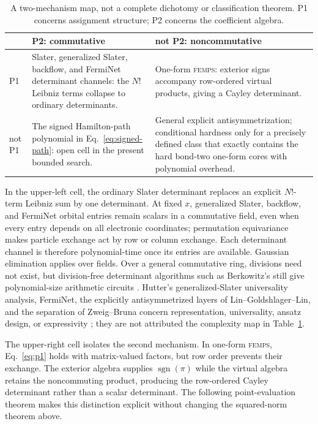 \documentclass[aps,pra,reprint,superscriptaddress,nofootinbib,longbibliography,showkeys]{revtex4-2}
\theoremstyle{definition}
\newcommand{\FEMPS}{\textnormal{\textsc{femps}}}
\begin{document}
\begin{table}[t]
\centering
\small
\renewcommand{\arraystretch}{1.12}
\begin{tabular}{@{}l l l@{}}
\toprule
 & P2: commutative & not P2: noncommutative \\
\midrule
P1 & \parbox[t]{72mm}{Slater, generalized Slater, backflow, and FermiNet
determinant channels: the $N!$ Leibniz terms collapse to ordinary
determinants.} & \parbox[t]{72mm}{One-form \FEMPS{}: exterior signs accompany
row-ordered virtual products, giving a Cayley determinant.} \\
not P1 & \parbox[t]{72mm}{The signed Hamilton-path polynomial in
Eq.~\eqref{eq:signed-path}: open cell in the present bounded search.} &
\parbox[t]{72mm}{General explicit antisymmetrization; conditional hardness
only for a precisely defined class that exactly contains the hard bond-two
one-form cores with polynomial overhead.} \\
\bottomrule
\end{tabular}
\caption{A two-mechanism map, not a complete dichotomy or classification
theorem.  P1 concerns assignment structure; P2 concerns the coefficient
algebra.}
\label{tab:two-mechanism-map}
\end{table}

In the upper-left cell, the ordinary Slater determinant replaces an explicit
$N!$-term Leibniz sum by one determinant.  At fixed $x$, generalized Slater,
backflow, and FermiNet orbital entries remain scalars in a commutative field,
even when every entry depends on all electronic coordinates; permutation
equivariance makes particle exchange act by row or column exchange.  Each
determinant channel is therefore polynomial-time once its entries are
available.  Gaussian elimination applies over fields.  Over a general
commutative ring, divisions need not exist, but division-free determinant
algorithms such as Berkowitz's still give polynomial-size arithmetic circuits
\cite{Berkowitz1984Determinant}.  Hutter's generalized-Slater universality
analysis, FermiNet, the explicitly antisymmetrized layers of
Lin--Goldshlager--Lin, and the separation of Zweig--Bruna concern
representation, universality, ansatz design, or expressivity
\cite{Hutter2020Antisymmetric,Pfau2020FermiNet,
LinGoldshlagerLin2023Antisymmetrized,ZweigBruna2022Separation}; they are not
attributed the complexity map in Table~\ref{tab:two-mechanism-map}.

The upper-right cell isolates the second mechanism.  In one-form \FEMPS{},
Eq.~\eqref{eq:p1} holds with matrix-valued factors, but row order prevents their
exchange.  The exterior algebra supplies $\operatorname{sgn}(\pi)$ while the
virtual algebra retains the noncommuting product, producing the row-ordered
Cayley determinant rather than a scalar determinant.  The following
point-evaluation theorem makes this distinction explicit without changing the
squared-norm theorem above.
\end{document}
